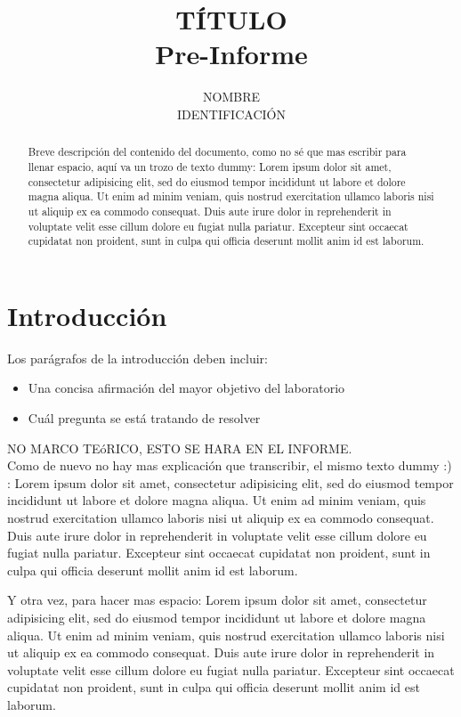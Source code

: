 \documentclass[a4paper, twocolumn, 11pt]{article}
\title{TÍTULO\\ \Large Pre-Informe}
\author{NOMBRE\\IDENTIFICACIÓN}
\date{}
\begin{document}
\maketitle
\begin{abstract}
Breve descripción del contenido del documento, como no sé que mas escribir para llenar espacio, aquí va un trozo de texto dummy: Lorem ipsum dolor sit amet, consectetur adipisicing elit, sed do eiusmod
tempor incididunt ut labore et dolore magna aliqua. Ut enim ad minim veniam,
quis nostrud exercitation ullamco laboris nisi ut aliquip ex ea commodo
consequat. Duis aute irure dolor in reprehenderit in voluptate velit esse
cillum dolore eu fugiat nulla pariatur. Excepteur sint occaecat cupidatat non
proident, sunt in culpa qui officia deserunt mollit anim id est laborum.
\end{abstract}
\section{Introducción}
\label{sec:intro}
Los parágrafos de la introducción deben incluir:
\begin{itemize}
 	\item{Una concisa afirmación del mayor objetivo del laboratorio}
 	\item{Cuál pregunta se está tratando de resolver}
 \end{itemize}
NO MARCO TEóRICO, ESTO SE HARA EN EL INFORME.\\

\noindent Como de nuevo no hay mas explicación que transcribir, el mismo texto dummy :) :
Lorem ipsum dolor sit amet, consectetur adipisicing elit, sed do eiusmod
tempor incididunt ut labore et dolore magna aliqua. Ut enim ad minim veniam,
quis nostrud exercitation ullamco laboris nisi ut aliquip ex ea commodo
consequat. Duis aute irure dolor in reprehenderit in voluptate velit esse
cillum dolore eu fugiat nulla pariatur. Excepteur sint occaecat cupidatat non
proident, sunt in culpa qui officia deserunt mollit anim id est laborum.

Y otra vez, para hacer mas espacio:
Lorem ipsum dolor sit amet, consectetur adipisicing elit, sed do eiusmod
tempor incididunt ut labore et dolore magna aliqua. Ut enim ad minim veniam,
quis nostrud exercitation ullamco laboris nisi ut aliquip ex ea commodo
consequat. Duis aute irure dolor in reprehenderit in voluptate velit esse
cillum dolore eu fugiat nulla pariatur. Excepteur sint occaecat cupidatat non
proident, sunt in culpa qui officia deserunt mollit anim id est laborum.
\end{document}
